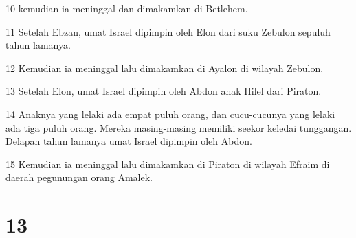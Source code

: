 \par 10 kemudian ia meninggal dan dimakamkan di Betlehem.
\par 11 Setelah Ebzan, umat Israel dipimpin oleh Elon dari suku Zebulon sepuluh tahun lamanya.
\par 12 Kemudian ia meninggal lalu dimakamkan di Ayalon di wilayah Zebulon.
\par 13 Setelah Elon, umat Israel dipimpin oleh Abdon anak Hilel dari Piraton.
\par 14 Anaknya yang lelaki ada empat puluh orang, dan cucu-cucunya yang lelaki ada tiga puluh orang. Mereka masing-masing memiliki seekor keledai tunggangan. Delapan tahun lamanya umat Israel dipimpin oleh Abdon.
\par 15 Kemudian ia meninggal lalu dimakamkan di Piraton di wilayah Efraim di daerah pegunungan orang Amalek.

\chapter{13}

